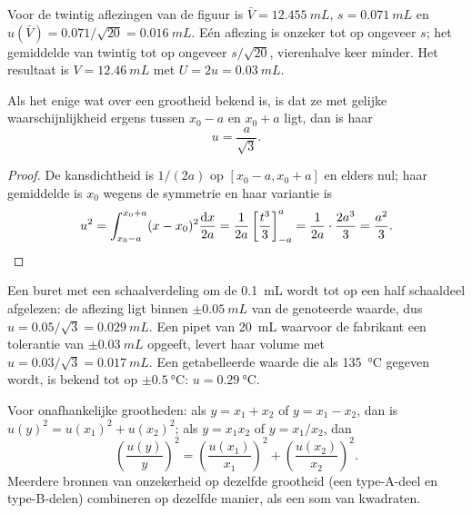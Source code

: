 \begin{example}
Voor de twintig aflezingen van de figuur is $\bar V = \qty{12.455}{mL}$,
$s = \qty{0.071}{mL}$ en $u(\bar V) = 0.071/\sqrt{20} = \qty{0.016}{mL}$.
Eén aflezing is onzeker tot op ongeveer $s$; het gemiddelde van twintig
tot op ongeveer $s/\sqrt{20}$, vierenhalve keer minder. Het resultaat is
$V = \qty{12.46}{mL}$ met $U = 2u = \qty{0.03}{mL}$.
\end{example}

\begin{proposition}\label{prop:b1:lab-techniques-1:type-b}
Als het enige wat over een grootheid bekend is, is dat ze met gelijke
waarschijnlijkheid ergens tussen $x_0 - a$ en $x_0 + a$ ligt, dan is haar
\[
  u = \frac{a}{\sqrt3}.
\]
\end{proposition}
\begin{proof}
De kansdichtheid is $1/(2a)$ op $[x_0 - a, x_0 + a]$ en elders nul; haar
gemiddelde is $x_0$ wegens de symmetrie en haar variantie is
\[
  u^2 = \int_{x_0-a}^{x_0+a} (x - x_0)^2 \frac{\mathrm{d}x}{2a}
      = \frac{1}{2a} \left[\frac{t^3}{3}\right]_{-a}^{a}
      = \frac{1}{2a}\cdot\frac{2a^3}{3} = \frac{a^2}{3}. \qedhere
\]
\end{proof}

\begin{example}
Een buret met een schaalverdeling om de \qty{0.1}{mL} wordt tot op een
half schaaldeel afgelezen: de aflezing ligt binnen $\pm\qty{0.05}{mL}$
van de genoteerde waarde, dus $u = 0.05/\sqrt3 = \qty{0.029}{mL}$. Een
pipet van \qty{20}{mL} waarvoor de fabrikant een tolerantie van
$\pm\qty{0.03}{mL}$ opgeeft, levert haar volume met
$u = 0.03/\sqrt3 = \qty{0.017}{mL}$. Een getabelleerde waarde die als
\qty{135}{\celsius} gegeven wordt, is bekend tot op
$\pm\qty{0.5}{\celsius}$: $u = \qty{0.29}{\celsius}$.
\end{example}

\begin{proposition}\label{prop:b1:lab-techniques-1:combine}
Voor onafhankelijke grootheden: als $y = x_1 + x_2$ of $y = x_1 - x_2$, dan
is $u(y)^2 = u(x_1)^2 + u(x_2)^2$; als $y = x_1 x_2$ of $y = x_1/x_2$, dan
\[
  \left(\frac{u(y)}{y}\right)^2 = \left(\frac{u(x_1)}{x_1}\right)^2
  + \left(\frac{u(x_2)}{x_2}\right)^2 .
\]
Meerdere bronnen van onzekerheid op dezelfde grootheid (een type-A-deel en
type-B-delen) combineren op dezelfde manier, als een som van kwadraten.
\end{proposition}
\admitted

